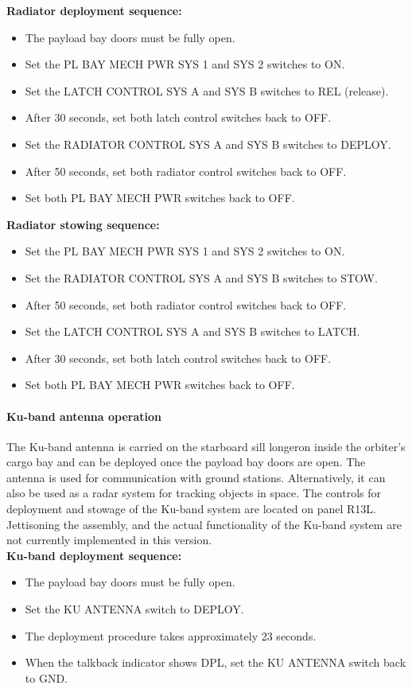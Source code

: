 \documentclass[Orbiter User Manual.tex]{subfiles}
\begin{document}
\noindent
\textbf{Radiator deployment sequence:}
\begin{itemize}
\item The payload bay doors must be fully open.
\item Set the PL BAY MECH PWR SYS 1 and SYS 2 switches to ON.
\item Set the LATCH CONTROL SYS A and SYS B switches to REL (release).
\item After 30 seconds, set both latch control switches back to OFF.
\item Set the RADIATOR CONTROL SYS A and SYS B switches to DEPLOY.
\item After 50 seconds, set both radiator control switches back to OFF.
\item Set both PL BAY MECH PWR switches back to OFF.
\end{itemize}

\noindent
\textbf{Radiator stowing sequence:}
\begin{itemize}
\item Set the PL BAY MECH PWR SYS 1 and SYS 2 switches to ON.
\item Set the RADIATOR CONTROL SYS A and SYS B switches to STOW.
\item After 50 seconds, set both radiator control switches back to OFF.
\item Set the LATCH CONTROL SYS A and SYS B switches to LATCH.
\item After 30 seconds, set both latch control switches back to OFF.
\item Set both PL BAY MECH PWR switches back to OFF.
\end{itemize}

\paragraph{Ku-band antenna operation}
\label{para:atlantis_antenna}
The Ku-band antenna is carried on the starboard sill longeron inside the orbiter's cargo bay and can be deployed once the payload bay doors are open. The antenna is used for communication with ground stations. Alternatively, it can also be used as a radar system for tracking objects in space. The controls for deployment and stowage of the Ku-band system are located on panel R13L. Jettisoning the assembly, and the actual functionality of the Ku-band system are not currently implemented in this version.\\

\noindent
\textbf{Ku-band deployment sequence:}
\begin{itemize}
\item The payload bay doors must be fully open.
\item Set the KU ANTENNA switch to DEPLOY.
\item The deployment procedure takes approximately 23 seconds.
\item When the talkback indicator shows DPL, set the KU ANTENNA switch back to GND.
\end{itemize}
\end{document}

